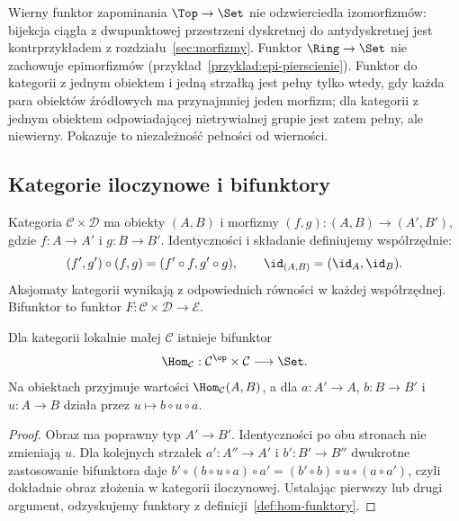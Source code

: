 \begin{przyklad}\label{cat:ex:functor-limits}
Wierny funktor zapominania $\Top\to\Set$ nie odzwierciedla izomorfizmów: bijekcja ciągła z dwupunktowej przestrzeni dyskretnej do antydyskretnej jest kontrprzykładem z rozdziału~\ref{sec:morfizmy}. Funktor $\Ring\to\Set$ nie zachowuje epimorfizmów (przykład~\ref{przyklad:epi-pierscienie}). Funktor do kategorii z jednym obiektem i jedną strzałką jest pełny tylko wtedy, gdy każda para obiektów źródłowych ma przynajmniej jeden morfizm; dla kategorii z jednym obiektem odpowiadającej nietrywialnej grupie jest zatem pełny, ale niewierny. Pokazuje to niezależność pełności od wierności.
\end{przyklad}

\subsection{Kategorie iloczynowe i bifunktory}

\begin{definicja}\label{cat:def:bifunctor}
Kategoria $\mathcal C\times\mathcal D$ ma obiekty $(A,B)$ i morfizmy $(f,g):(A,B)\to(A',B')$, gdzie $f:A\to A'$ i $g:B\to B'$. Identyczności i składanie definiujemy współrzędnie:
\[
(f',g')\circ(f,g)=(f'\circ f,g'\circ g),
\qquad \id_{(A,B)}=(\id_A,\id_B).
\]
Aksjomaty kategorii wynikają z odpowiednich równości w każdej współrzędnej. Bifunktor to funktor $F:\mathcal C\times\mathcal D\to\mathcal E$.
\end{definicja}

\begin{stwierdzenie}\label{cat:prop:hom-bifunctor}
Dla kategorii lokalnie małej $\mathcal C$ istnieje bifunktor
\[
\Hom_{\mathcal C}:\mathcal C^{\op}\times\mathcal C\longrightarrow\Set.
\]
Na obiektach przyjmuje wartości $\Hom_{\mathcal C}(A,B)$, a dla $a:A'\to A$, $b:B\to B'$ i $u:A\to B$ działa przez $u\mapsto b\circ u\circ a$.
\end{stwierdzenie}
\begin{proof}
Obraz ma poprawny typ $A'\to B'$. Identyczności po obu stronach nie zmieniają $u$. Dla kolejnych strzałek $a':A''\to A'$ i $b':B'\to B''$ dwukrotne zastosowanie bifunktora daje $b'\circ(b\circ u\circ a)\circ a'=(b'\circ b)\circ u\circ(a\circ a')$, czyli dokładnie obraz złożenia w kategorii iloczynowej. Ustalając pierwszy lub drugi argument, odzyskujemy funktory z definicji~\ref{def:hom-funktory}.
\end{proof}

